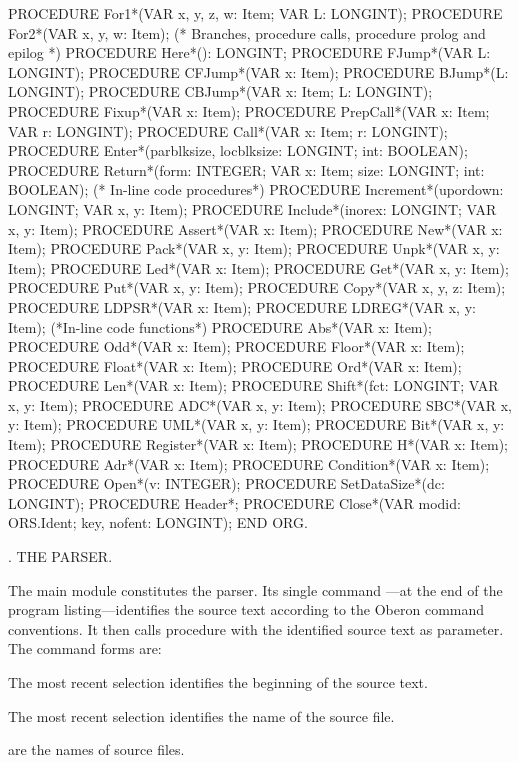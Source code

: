   PROCEDURE For1*(VAR x, y, z, w: Item; VAR L: LONGINT);
  PROCEDURE For2*(VAR x, y, w: Item);
  (* Branches, procedure calls, procedure prolog and epilog *)
  PROCEDURE Here*(): LONGINT;
  PROCEDURE FJump*(VAR L: LONGINT);
  PROCEDURE CFJump*(VAR x: Item);
  PROCEDURE BJump*(L: LONGINT);
  PROCEDURE CBJump*(VAR x: Item; L: LONGINT);
  PROCEDURE Fixup*(VAR x: Item);
  PROCEDURE PrepCall*(VAR x: Item; VAR r: LONGINT);
  PROCEDURE Call*(VAR x: Item; r: LONGINT);
  PROCEDURE Enter*(parblksize, locblksize: LONGINT; int: BOOLEAN);
  PROCEDURE Return*(form: INTEGER; VAR x: Item; size: LONGINT; int: BOOLEAN);
  (* In-line code procedures*)
  PROCEDURE Increment*(upordown: LONGINT; VAR x, y: Item);
  PROCEDURE Include*(inorex: LONGINT; VAR x, y: Item);
  PROCEDURE Assert*(VAR x: Item);
  PROCEDURE New*(VAR x: Item);
  PROCEDURE Pack*(VAR x, y: Item);
  PROCEDURE Unpk*(VAR x, y: Item);
  PROCEDURE Led*(VAR x: Item);
  PROCEDURE Get*(VAR x, y: Item);
  PROCEDURE Put*(VAR x, y: Item);
  PROCEDURE Copy*(VAR x, y, z: Item);
  PROCEDURE LDPSR*(VAR x: Item);
  PROCEDURE LDREG*(VAR x, y: Item);
  (*In-line code functions*)
  PROCEDURE Abs*(VAR x: Item);
  PROCEDURE Odd*(VAR x: Item);
  PROCEDURE Floor*(VAR x: Item);
  PROCEDURE Float*(VAR x: Item);
  PROCEDURE Ord*(VAR x: Item);
  PROCEDURE Len*(VAR x: Item);
  PROCEDURE Shift*(fct: LONGINT; VAR x, y: Item);
  PROCEDURE ADC*(VAR x, y: Item);
  PROCEDURE SBC*(VAR x, y: Item);
  PROCEDURE UML*(VAR x, y: Item);
  PROCEDURE Bit*(VAR x, y: Item);
  PROCEDURE Register*(VAR x: Item);
  PROCEDURE H*(VAR x: Item);
  PROCEDURE Adr*(VAR x: Item);
  PROCEDURE Condition*(VAR x: Item);
  PROCEDURE Open*(v: INTEGER);
  PROCEDURE SetDataSize*(dc: LONGINT);
  PROCEDURE Header*;
  PROCEDURE Close*(VAR modid: ORS.Ident; key, nofent: LONGINT);
END ORG.
\endtt

. THE PARSER.

The main module  constitutes the parser. Its single command ---at the end of the program listing---identifies the source text according to the Oberon command conventions. It then calls procedure  with the identified source text as parameter. The command forms are:

\item{}  The most recent selection identifies the beginning of the source text.
\item{}  The most recent selection identifies the name of the source file.
\item{}   are the names of source files.

